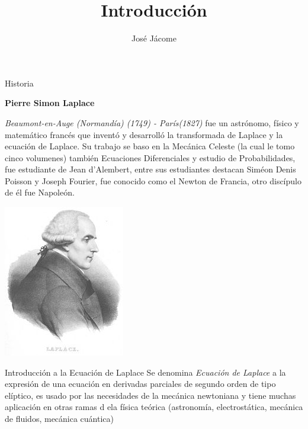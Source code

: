 \documentclass[11pt]{beamer}
\author{José Jácome}
\title{Introducción}
\begin{document}
\begin{frame}
\titlepage
\end{frame}


\begin{frame}{Historia}

\begin{center}
\textbf{Pierre Simon Laplace}
\end{center}

\textit{Beaumont-en-Auge (Normandía) (1749) - París(1827)} fue un astrónomo, físico y matemático francés que inventó y desarrolló la transformada de Laplace y la ecuación de Laplace. Su trabajo se baso en la Mecánica Celeste (la cual le tomo cinco volumenes) también Ecuaciones Diferenciales y estudio de Probabilidades, fue estudiante de Jean d'Alembert, entre sus estudiantes destacan Siméon Denis Poisson y Joseph Fourier, fue conocido como el Newton de Francia, otro discípulo de él fue Napoleón.
\begin{center}
\includegraphics[scale=1.2]{Laplace.jpg}
\end{center}
\end{frame}

\begin{frame}{Introducción a la Ecuación de Laplace}
Se denomina \textit{Ecuación de Laplace} a la expresión de una ecuación en derivadas parciales de segundo orden de tipo elíptico, es usado por las necesidades de la mecánica newtoniana y tiene muchas aplicación en otras ramas d ela física teórica (astronomía, electrostática, mecánica de fluidos, mecánica cuántica)

\end{frame}
\end{document}
